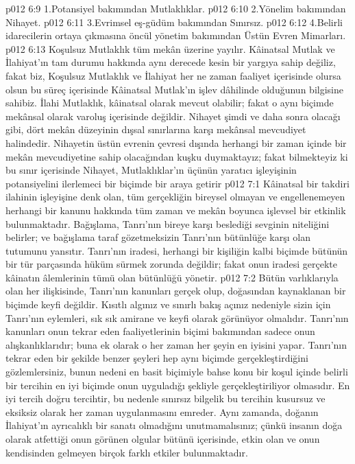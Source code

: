 \vs p012 6:9 1.\bibnobreakspace Potansiyel bakımından Mutlaklıklar.
\vs p012 6:10 2.\bibnobreakspace Yönelim bakımından Nihayet.
\vs p012 6:11 3.\bibnobreakspace Evrimsel eş\hyp{}güdüm bakımından Sınırsız.
\vs p012 6:12 4.\bibnobreakspace Belirli idarecilerin ortaya çıkmasına öncül yönetim bakımından Üstün Evren Mimarları.
\vs p012 6:13 Koşulsuz Mutlaklık tüm mekân üzerine yayılır. Kâinatsal Mutlak ve İlahiyat’ın tam durumu hakkında aynı derecede kesin bir yargıya sahip değiliz, fakat biz, Koşulsuz Mutlaklık ve İlahiyat her ne zaman faaliyet içerisinde olursa olsun bu süreç içerisinde Kâinatsal Mutlak’ın işlev dâhilinde olduğunun bilgisine sahibiz. İlahi Mutlaklık, kâinatsal olarak mevcut olabilir; fakat o aynı biçimde mekânsal olarak varoluş içerisinde değildir. Nihayet şimdi ve daha sonra olacağı gibi, dört mekân düzeyinin dışsal sınırlarına karşı mekânsal mevcudiyet halindedir. Nihayetin üstün evrenin çevresi dışında herhangi bir zaman içinde bir mekân mevcudiyetine sahip olacağından kuşku duymaktayız; fakat bilmekteyiz ki bu sınır içerisinde Nihayet, Mutlaklıklar’ın üçünün yaratıcı işleyişinin potansiyelini ilerlemeci bir biçimde bir araya getirir
\vs p012 7:1 Kâinatsal bir takdiri ilahinin işleyişine denk olan, tüm gerçekliğin bireysel olmayan ve engellenemeyen herhangi bir kanunu hakkında tüm zaman ve mekân boyunca işlevsel bir etkinlik bulunmaktadır. Bağışlama, Tanrı’nın bireye karşı beslediği sevginin niteliğini belirler; ve bağışlama taraf gözetmeksizin Tanrı’nın bütünlüğe karşı olan tutumunu yansıtır. Tanrı’nın iradesi, herhangi bir kişiliğin kalbi biçimde bütünün bir tür parçasında hüküm sürmek zorunda değildir; fakat onun iradesi gerçekte kâinatın âlemlerinin tümü olan bütünlüğü yönetir.
\vs p012 7:2 Bütün varlıklarıyla olan her ilişkisinde, Tanrı’nın kanunları gerçek olup, doğasından kaynaklanan bir biçimde keyfi değildir. Kısıtlı algınız ve sınırlı bakış açınız nedeniyle sizin için Tanrı’nın eylemleri, sık sık amirane ve keyfi olarak görünüyor olmalıdır. Tanrı’nın kanunları onun tekrar eden faaliyetlerinin biçimi bakımından sadece onun alışkanlıklarıdır; buna ek olarak o her zaman her şeyin en iyisini yapar. Tanrı’nın tekrar eden bir şekilde benzer şeyleri hep aynı biçimde gerçekleştirdiğini gözlemlersiniz, bunun nedeni en basit biçimiyle bahse konu bir koşul içinde belirli bir tercihin en iyi biçimde onun uyguladığı şekliyle gerçekleştiriliyor olmasıdır. En iyi tercih doğru tercihtir, bu nedenle sınırsız bilgelik bu tercihin kusursuz ve eksiksiz olarak her zaman uygulanmasını emreder. Aynı zamanda, doğanın İlahiyat’ın ayrıcalıklı bir sanatı olmadığını unutmamalısınız; çünkü insanın doğa olarak atfettiği onun görünen olgular bütünü içerisinde, etkin olan ve onun kendisinden gelmeyen birçok farklı etkiler bulunmaktadır.
